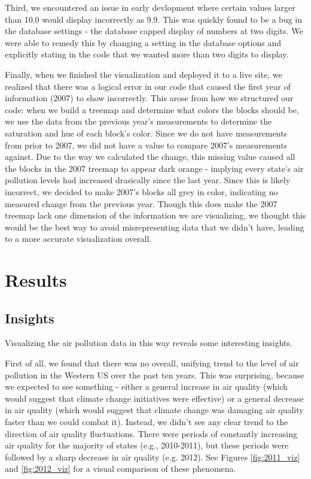 \documentclass[journal]{vgtc}                %
\begin{document}
Third, we encountered an issue in early devlopment where certain values larger than 10.0 would display incorrectly as 9.9. This was quickly
found to be a bug in the database settings - the database capped display of numbers at two digits. We were able to remedy this by changing 
a setting in the database options and explicitly stating in the code that we wanted more than two digits to display. 

Finally, when we finished the visualization and deployed it to a live site, we realized that there was a logical error in our code
that caused the first year of information (2007) to show incorrectly. This arose from how we structured our code: when we build a 
treemap and determine what colors the blocks should be, we use the data from the previous year's measurements to determine the saturation
and hue of each block's color. Since we do not have measurements from prior to 2007, we did not have a value to compare 2007's measurements
against. Due to the way we calculated the change, this missing value caused all the blocks in the 2007 treemap to appear dark orange - implying
every state's air pollution levels had increased drasically since the last year. Since this is likely incorrect, we decided to make 2007's blocks
all grey in color, indicating no measured change from the previous year. Though this does make the 2007 treemap lack one dimension of the information
we are visualizing, we thought this would be the best way to avoid misrepresenting data that we didn't have, leading to a more accurate
visualization overall.

\section{Results}

\subsection{Insights}

Visualizing the air pollution data in this way reveals some interesting insights.

First of all, we found that there was no overall, unifying trend to the level of air pollution in the Western US
over the past ten years. This was surprising, because we expected to see something - either a general increase in air quality
(which would suggest that climate change initiatives were effective) or a general decrease in air quality (which
would suggest that climate change was damaging air quality faster than we could combat it). Instead, we didn't see any clear 
trend to the direction of air quality fluctuations. There were periods of constantly increasing air quality for the majority 
of states (e.g., 2010-2011), but these periods were followed by a sharp decrease in air quality (e.g. 2012). See Figures \ref{fig:2011_viz}
and \ref{fig:2012_viz} for a visual comparison of these phenomena.
\end{document}
